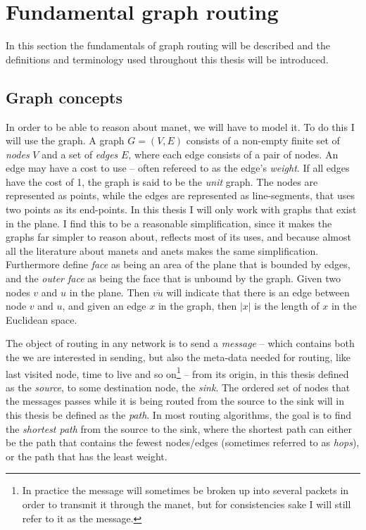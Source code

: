 \section{Fundamental graph routing}
\label{section:fundamental_graph_routing}
In this section the fundamentals of graph routing will be described and the definitions and terminology used throughout this thesis will be introduced.

\subsection{Graph concepts}
\label{section:graph_concepts}
In order to be able to reason about \ac{manet}, we will have to model it. To do this I will use the graph. A graph $G = (V, E)$ consists of a non-empty finite set of \emph{nodes} $V$ and a set of \emph{edges} $E$, where each edge consists of a pair of nodes. An edge may have a cost to use -- often refereed to as the edge's \emph{weight}. If all edges have the cost of 1, the graph is said to be the \emph{unit} graph. The nodes are represented as points, while the edges are represented as line-segments, that uses two points as its end-points. In this thesis I will only work with graphs that exist in the plane. I find this to be a reasonable simplification, since it makes the graphs far simpler to reason about, reflects most of its uses, and because almost all the literature about \acp{manet} and \acp{anet} makes the same simplification. Furthermore define \emph{face} as being an area of the plane that is bounded by edges, and the \emph{outer face} as being the face that is unbound by the graph. Given two nodes $v$ and $u$ in the plane. Then $\overline{vu}$ will indicate that there is an edge between node $v$ and $u$, and given an edge $x$ in the graph, then $|x|$ is the length of $x$ in the Euclidean space.

The object of routing in any network is to send a \emph{message} -- which contains both the we are interested in sending, but also the meta-data needed for routing, like last visited node, time to live and so on\footnote{In practice the message will sometimes be broken up into several packets in order to transmit it through the \ac{manet}, but for consistencies sake I will still refer to it as the message.} -- from its origin, in this thesis defined as the \emph{source}, to some destination node, the \emph{sink}. The ordered set of nodes that the messages passes while it is being routed from the source to the sink will in this thesis be defined as the \emph{path}. In most routing algorithms, the goal is to find the \emph{shortest path} from the source to the sink, where the shortest path can either be the path that contains the fewest nodes/edges (sometimes referred to as \emph{hops}), or the path that has the least weight.

